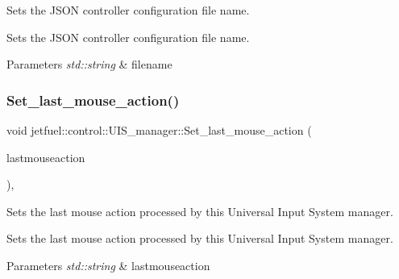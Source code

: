 Sets the J\+S\+ON controller configuration file name. 

Sets the J\+S\+ON controller configuration file name.


\begin{DoxyParams}{Parameters}
{\em std\+::string} & filename \\
\hline
\end{DoxyParams}
\mbox{\label{classjetfuel_1_1control_1_1UIS__manager_aa9fc7545ca5bcc229567f86945e981cd}} 
\subsubsection{\texorpdfstring{Set\+\_\+last\+\_\+mouse\+\_\+action()}{Set\_last\_mouse\_action()}}
{\footnotesize\ttfamily void jetfuel\+::control\+::\+U\+I\+S\+\_\+manager\+::\+Set\+\_\+last\+\_\+mouse\+\_\+action (\begin{DoxyParamCaption}\item[{const std\+::string}]{lastmouseaction }\end{DoxyParamCaption})\hspace{0.3cm}{\ttfamily [inline]}, {\ttfamily [protected]}}



Sets the last mouse action processed by this Universal Input System manager. 

Sets the last mouse action processed by this Universal Input System manager.


\begin{DoxyParams}{Parameters}
{\em std\+::string} & lastmouseaction \\
\hline
\end{DoxyParams}
\mbox{\label{classjetfuel_1_1control_1_1UIS__manager_a5fff180a335246d905531a00bc34fbe8}} 

